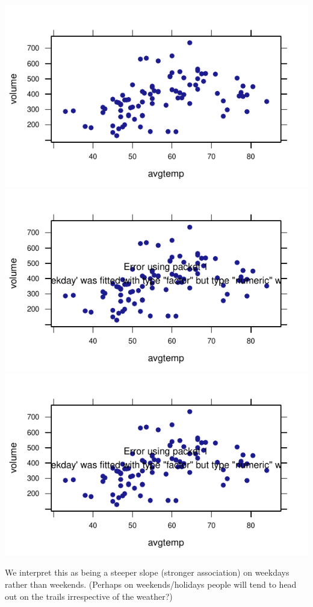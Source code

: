\documentclass{tufte-book}\usepackage[]{graphicx}\usepackage[]{xcolor}
\makeatletter
\def\maxwidth{ %
  \ifdim\Gin@nat@width>\linewidth
    \linewidth
  \else
    \Gin@nat@width
  \fi
}
\newenvironment{knitrout}{}{} %
\makeatother
\begin{document}
\begin{solution}
\begin{knitrout}
{\centering \includegraphics[width=\maxwidth]{figures/FrontMatter-unnamed-chunk-67-1} 
\includegraphics[width=\maxwidth]{figures/FrontMatter-unnamed-chunk-67-2} 
\includegraphics[width=\maxwidth]{figures/FrontMatter-unnamed-chunk-67-3} 

}



\end{knitrout}
We
interpret this as being a steeper slope (stronger association) on weekdays rather than weekends.
(Perhaps on weekends/holidays people will tend to head out on the trails irrespective of the weather?)
\end{solution}
\end{document}
